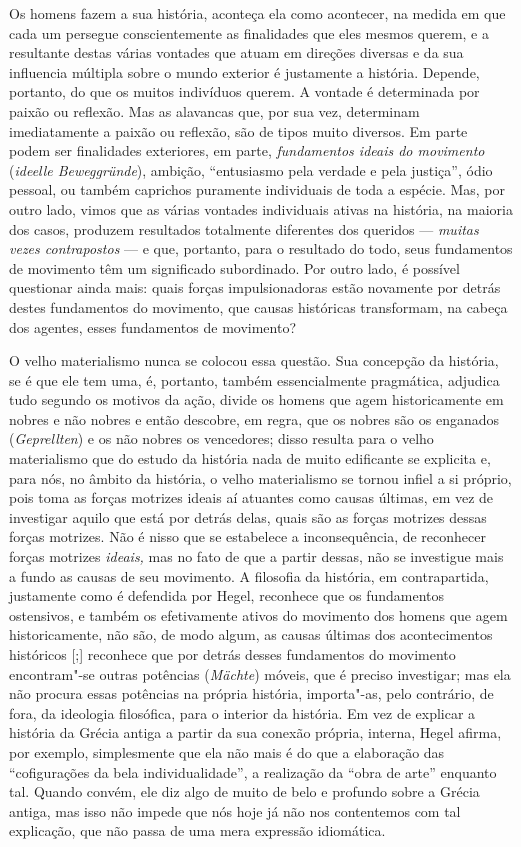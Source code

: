 Os homens fazem a sua história, aconteça ela como acontecer, na medida
em que cada um persegue conscientemente as finalidades que eles mesmos
querem, e a resultante destas várias vontades que atuam em direções
diversas e da sua influencia múltipla sobre o mundo exterior é
justamente a história. Depende, portanto, do que os muitos indivíduos
querem. A vontade é determinada por paixão ou reflexão. Mas as alavancas
que, por sua vez, determinam imediatamente a paixão ou reflexão, são de
tipos muito diversos. Em parte podem ser finalidades exteriores, em
parte, \emph{fundamentos ideais do movimento} (\emph{ideelle
Beweggründe}), ambição, ``entusiasmo pela verdade e pela justiça'', ódio
pessoal, ou também caprichos puramente individuais de toda a espécie.
Mas, por outro lado, vimos que as várias vontades individuais ativas na
história, na maioria dos casos, produzem resultados totalmente
diferentes dos queridos --- \emph{muitas vezes contrapostos} --- e que,
portanto, para o resultado do todo, seus fundamentos de movimento têm um
significado subordinado. Por outro lado, é possível questionar ainda
mais: quais forças impulsionadoras estão novamente por detrás destes
fundamentos do movimento, que causas históricas transformam, na cabeça
dos agentes, esses fundamentos de movimento?

O velho materialismo nunca se colocou essa questão. Sua concepção da
história, se é que ele tem uma, é, portanto, também essencialmente
pragmática, adjudica tudo segundo os motivos da ação, divide os homens
que agem historicamente em nobres e não nobres e então descobre, em
regra, que os nobres são os enganados (\emph{Geprellten}) e os não
nobres os vencedores; disso resulta para o velho materialismo que do
estudo da história nada de muito edificante se explicita e, para nós, no
âmbito da história, o velho materialismo se tornou infiel a si próprio,
pois toma as forças motrizes ideais aí atuantes como causas últimas, em
vez de investigar aquilo que está por detrás delas, quais são as forças
motrizes dessas forças motrizes. Não é nisso que se estabelece a
inconsequência, de reconhecer forças motrizes \emph{ideais, }mas no fato
de que a partir dessas, não se investigue mais a fundo as causas de seu
movimento. A filosofia da história, em contrapartida, justamente como é
defendida
por Hegel,
reconhece que os fundamentos ostensivos, e também os efetivamente ativos
do movimento dos homens que agem historicamente, não são, de modo algum,
as causas últimas dos acontecimentos históricos {[};{]} reconhece que
por detrás desses fundamentos do movimento encontram"-se outras potências
(\emph{Mächte}) móveis, que é preciso investigar; mas ela não procura
essas potências na própria história, importa"-as, pelo contrário, de
fora, da ideologia filosófica, para o interior da história. Em vez de
explicar a história da Grécia antiga a partir da sua conexão própria,
interna, Hegel afirma,
por exemplo, simplesmente que ela não mais é do que a elaboração das
``cofigurações da bela individualidade'', a realização da ``obra de
arte'' enquanto tal. Quando convém, ele diz algo de muito de belo e
profundo sobre a Grécia antiga, mas isso não impede que nós hoje já não
nos contentemos com tal explicação, que não passa de uma mera expressão
idiomática.

